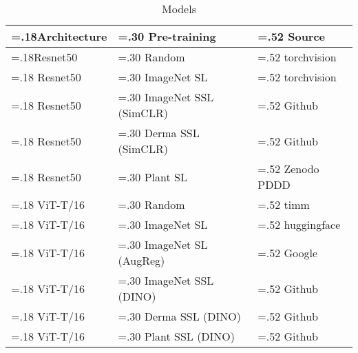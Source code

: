 \begin{table}[H]
\centering
\caption{Models \label{tab:models}}
\begin{tabularx}{\textwidth}{|
    >{\hsize=.18\hsize}X |
    >{\hsize=.30\hsize}X |
    >{\hsize=.52\hsize}X |
}
\hline
\textbf{Architecture} & \textbf{Pre-training} & \textbf{Source} \tabularnewline \hline
Resnet50 & Random & torchvision \tabularnewline \hline
Resnet50 & ImageNet SL & torchvision \tabularnewline \hline
Resnet50 & ImageNet SSL (SimCLR) & Github \autocite{groeger2022} \tabularnewline \hline
Resnet50 & Derma SSL (SimCLR) & Github \autocite{groeger2022} \tabularnewline \hline
Resnet50 & Plant SL & Zenodo PDDD \autocite{zenodo2023} \tabularnewline \hline
ViT-T/16 & Random & timm \tabularnewline \hline
ViT-T/16 & ImageNet SL & huggingface \autocite{winkawaks2022} \tabularnewline \hline
ViT-T/16 & ImageNet SL (AugReg) & Google \autocite{google2024} \tabularnewline \hline
ViT-T/16 & ImageNet SSL (DINO) & Github \autocite{groeger2022} \tabularnewline \hline
ViT-T/16 & Derma SSL (DINO) & Github \autocite{groeger2022} \tabularnewline \hline
ViT-T/16 & Plant SSL (DINO) & Github \autocite{groeger2022} \tabularnewline \hline
\end{tabularx} 
\end{table}
